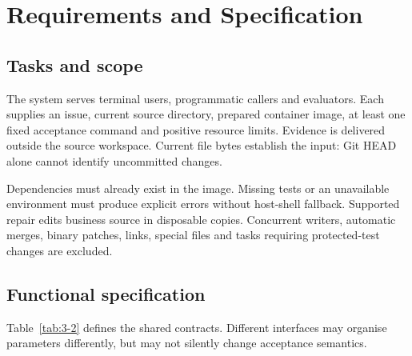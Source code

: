 \chapter{Requirements and Specification}\label{chap:3}

\section{Tasks and scope}\label{sec:3.1}

The system serves terminal users, programmatic callers and evaluators. Each supplies an issue, current source directory, prepared container image, at least one fixed acceptance command and positive resource limits. Evidence is delivered outside the source workspace. Current file bytes establish the input: Git HEAD alone cannot identify uncommitted changes.

Dependencies must already exist in the image. Missing tests or an unavailable environment must produce explicit errors without host-shell fallback. Supported repair edits business source in disposable copies. Concurrent writers, automatic merges, binary patches, links, special files and tasks requiring protected-test changes are excluded.

\section{Functional specification}\label{sec:3.2}

Table~\ref{tab:3-2} defines the shared contracts. Different interfaces may organise parameters differently, but may not silently change acceptance semantics.

